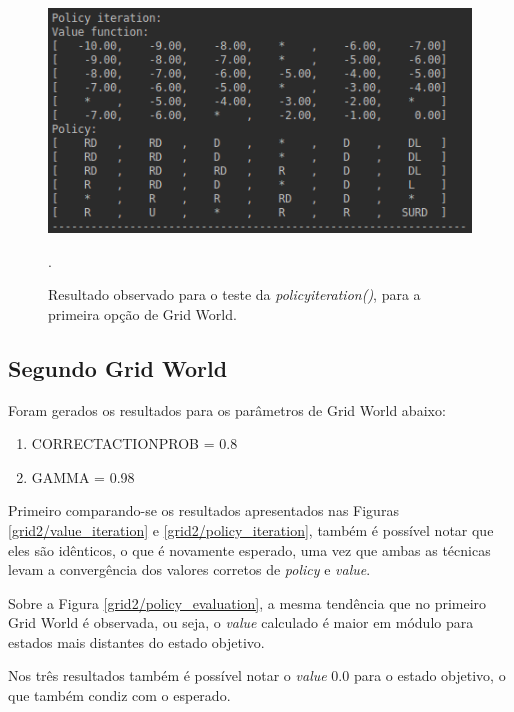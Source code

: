 \documentclass[conference]{IEEEtran}
\begin{document}
\begin{figure}[htbp]
\centering
\centerline{\includegraphics[scale=0.5]{imagens/grid1/policy_iteration.png}}
\caption{Resultado observado para o teste da \textit{policy\underline{\space}iteration()}, para a primeira opção de Grid World.}.
\label{grid1/policy_iteration}
\end{figure}

\subsection{Segundo Grid World}
Foram gerados os resultados para os parâmetros de Grid World abaixo:

\begin{enumerate}
\item CORRECT\underline{\space}ACTION\underline{\space}PROB = 0.8

\item GAMMA = 0.98
\end{enumerate}

Primeiro comparando-se os resultados apresentados nas Figuras \ref{grid2/value_iteration} e \ref{grid2/policy_iteration}, também é possível notar que eles são idênticos, o que é novamente esperado, uma vez que ambas as técnicas levam a convergência dos valores corretos de \textit{policy} e \textit{value}.

Sobre a Figura \ref{grid2/policy_evaluation}, a mesma tendência que no primeiro Grid World é observada, ou seja, o \textit{value} calculado é maior em módulo para estados mais distantes do estado objetivo.

Nos três resultados também é possível notar o \textit{value} 0.0 para o estado objetivo, o que também condiz com o esperado. 
\end{document}
